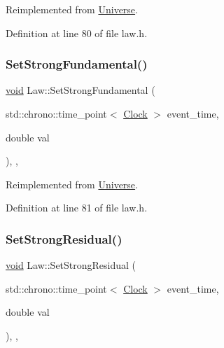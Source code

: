 Reimplemented from \mbox{\hyperlink{class_universe_a5946c8f3d4cda305f3ecd10df21a2f94}{Universe}}.



Definition at line 80 of file law.\+h.

\mbox{\label{class_law_a4a7c8caa24acf453c1a8782a1ec4acf4}} 
\subsubsection{\texorpdfstring{Set\+Strong\+Fundamental()}{SetStrongFundamental()}}
{\footnotesize\ttfamily \mbox{\hyperlink{glad_8h_a950fc91edb4504f62f1c577bf4727c29}{void}} Law\+::\+Set\+Strong\+Fundamental (\begin{DoxyParamCaption}\item[{std\+::chrono\+::time\+\_\+point$<$ \mbox{\hyperlink{universe_8h_a0ef8d951d1ca5ab3cfaf7ab4c7a6fd80}{Clock}} $>$}]{event\+\_\+time,  }\item[{double}]{val }\end{DoxyParamCaption})\hspace{0.3cm}{\ttfamily [inline]}, {\ttfamily [final]}, {\ttfamily [virtual]}}



Reimplemented from \mbox{\hyperlink{class_universe_aafec97a231126b71c73ac1258609a284}{Universe}}.



Definition at line 81 of file law.\+h.

\mbox{\label{class_law_ad4a05c77d11ddec40b1e07246cac449d}} 
\subsubsection{\texorpdfstring{Set\+Strong\+Residual()}{SetStrongResidual()}}
{\footnotesize\ttfamily \mbox{\hyperlink{glad_8h_a950fc91edb4504f62f1c577bf4727c29}{void}} Law\+::\+Set\+Strong\+Residual (\begin{DoxyParamCaption}\item[{std\+::chrono\+::time\+\_\+point$<$ \mbox{\hyperlink{universe_8h_a0ef8d951d1ca5ab3cfaf7ab4c7a6fd80}{Clock}} $>$}]{event\+\_\+time,  }\item[{double}]{val }\end{DoxyParamCaption})\hspace{0.3cm}{\ttfamily [inline]}, {\ttfamily [final]}, {\ttfamily [virtual]}}



